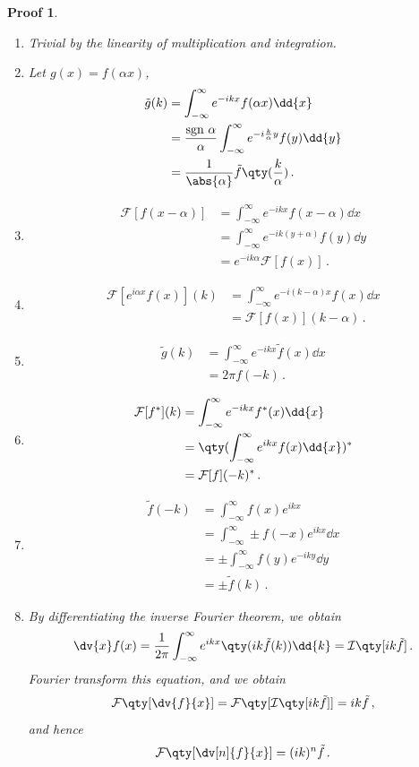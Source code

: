 \documentclass{article}
\theoremstyle{plain}\theoremheaderfont{\normalfont\itshape}\theorembodyfont{\rmfamily}\theoremseparator{.}\newtheorem*{rem}{Remark}\newtheorem*{ex}{Example}\newtheorem*{proof}{Proof}\newtheorem*{altp}{Alternative proof}
\theoremstyle{plain}\theoremheaderfont{\normalfont\bfseries}\theorembodyfont{\rmfamily}\theoremseparator{.}\newtheorem{thm}{Theorem}[section]\newtheorem{lem}[thm]{Lemma}\newtheorem{prop}[thm]{Proposition}\newtheorem*{cor}{Corollary}\newtheorem{defn}[thm]{Definition}\newtheorem{clm}[thm]{Claim}\newtheorem{clminproof}{Claim}
\theoremstyle{break}\theoremheaderfont{\normalfont\itshape}\theorembodyfont{\rmfamily}\theoremseparator{.\medskip}\newtheorem*{proofskip}{Proof}\newtheorem*{exs}{Examples}\newtheorem*{rems}{Remarks}
\theoremstyle{break}\theoremheaderfont{\normalfont\bfseries}\theorembodyfont{\rmfamily}\theoremseparator{.\medskip}\newtheorem{lemskip}[thm]{Lemma}\newtheorem{defnskip}[thm]{Definition}\newtheorem{propskip}[thm]{Proposition}\newtheorem{thmskip}[thm]{Theorem}
\numberwithin{equation}{section}
\begin{document}
	\begin{proofskip}
		\begin{enumerate}[parsep=1em]
			\item Trivial by the linearity of multiplication and integration.
			\item Let \(g(x)=f(\alpha x)\),
			\begin{align*}
				\tilde{g}(k)&=\int_{-\infty}^{\infty}e^{-ikx}f(\alpha x)\dd{x}\\
				&=\frac{\text{sgn }\alpha}{\alpha}\int_{-\infty}^{\infty}e^{-i\frac{k}{\alpha}y}f(y)\dd{y}\\
				&=\frac{1}{\abs{\alpha}}\tilde{f}\qty(\frac{k}{\alpha})\,.
			\end{align*}
			\item
			\begin{align*}
				\mathcal{F}[f(x-\alpha)]&=\int_{-\infty}^{\infty}e^{-ikx}f(x-\alpha)\dd{x}\\
				&=\int_{-\infty}^{\infty}e^{-ik(y+\alpha)}f(y)\dd{y}\\
				&=e^{-ik\alpha}\mathcal{F}[f(x)]\,.
			\end{align*}
			\item
			\begin{align*}
				\mathcal{F}[e^{i\alpha x}f(x)](k)&=\int_{-\infty}^{\infty}e^{-i(k-\alpha)x}f(x)\dd{x}\\
				&=\mathcal{F}[f(x)](k-\alpha)\,.
			\end{align*}
			\item
			\begin{align*}
				\tilde{g}(k)&=\int_{-\infty}^{\infty}e^{-ikx}\tilde{f}(x)\dd{x}\\
				&=2\pi f(-k)\,.
			\end{align*}
			\item
			\begin{align*}
				\mathcal{F}[f^*](k)&=\int_{-\infty}^{\infty}e^{-ikx}f^*(x)\dd{x}\\
				&=\qty(\int_{-\infty}^{\infty}e^{ikx}f(x)\dd{x})^*\\
				&=\mathcal{F}[f](-k)^*\,.
			\end{align*}
			\item
			\begin{align*}
				\tilde{f}(-k)&=\int_{-\infty}^{\infty}f(x)e^{ikx}\\
				&=\int_{-\infty}^{\infty}\pm f(-x)e^{ikx}\dd{x}\\
				&=\pm\int_{-\infty}^{\infty}f(y)e^{-iky}\dd{y}\\
				&=\pm\tilde{f}(k)\,.
			\end{align*}
			\item By differentiating the inverse Fourier theorem, we obtain
			\[\dv{x} f(x)=\frac{1}{2\pi}\int_{-\infty}^{\infty}e^{ikx}\qty(ik\tilde{f}(k))\dd{k}=\mathcal{I}\qty[ik\tilde{f}]\,.\]
			Fourier transform this equation, and we obtain
			\[\mathcal{F}\qty[\dv{f}{x}]=\mathcal{F}\qty[\mathcal{I}\qty[ik\tilde{f}]]=ik\tilde{f}\,,\]
			and hence
			\[\mathcal{F}\qty[\dv[n]{f}{x}]=(ik)^n\tilde{f}\,.\]
					

\end{enumerate}
\end{proofskip}
\end{document}
